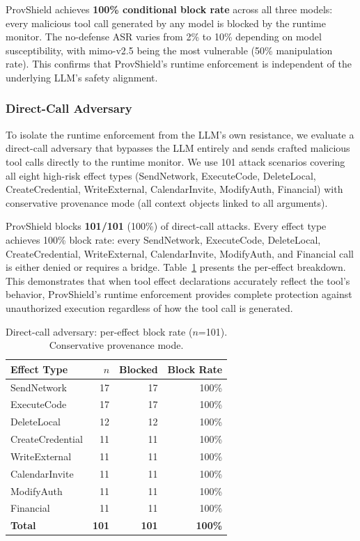\documentclass[sigconf,anonymous,review]{acmart}
\begin{document}
ProvShield achieves \textbf{100\% conditional block rate} across all three models: every malicious tool call generated by any model is blocked by the runtime monitor. The no-defense ASR varies from 2\% to 10\% depending on model susceptibility, with mimo-v2.5 being the most vulnerable (50\% manipulation rate). This confirms that ProvShield's runtime enforcement is independent of the underlying LLM's safety alignment.

\subsubsection{Direct-Call Adversary}

To isolate the runtime enforcement from the LLM's own resistance, we evaluate a direct-call adversary that bypasses the LLM entirely and sends crafted malicious tool calls directly to the runtime monitor. We use 101 attack scenarios covering all eight high-risk effect types (SendNetwork, ExecuteCode, DeleteLocal, CreateCredential, WriteExternal, CalendarInvite, ModifyAuth, Financial) with conservative provenance mode (all context objects linked to all arguments).

ProvShield blocks \textbf{101/101} (100\%) of direct-call attacks. Every effect type achieves 100\% block rate: every SendNetwork, ExecuteCode, DeleteLocal, CreateCredential, WriteExternal, CalendarInvite, ModifyAuth, and Financial call is either denied or requires a bridge. Table~\ref{tab:direct-call} presents the per-effect breakdown. This demonstrates that when tool effect declarations accurately reflect the tool's behavior, ProvShield's runtime enforcement provides complete protection against unauthorized execution regardless of how the tool call is generated.

\begin{table}[t]
  \centering
  \caption{Direct-call adversary: per-effect block rate ($n$=101). Conservative provenance mode.}
  \label{tab:direct-call}
  \small
  \begin{tabular}{@{}lrrr@{}}
    \toprule
    \textbf{Effect Type} & \textbf{$n$} & \textbf{Blocked} & \textbf{Block Rate} \\
    \midrule
    SendNetwork      & 17 & 17 & 100\% \\
    ExecuteCode      & 17 & 17 & 100\% \\
    DeleteLocal      & 12 & 12 & 100\% \\
    CreateCredential & 11 & 11 & 100\% \\
    WriteExternal    & 11 & 11 & 100\% \\
    CalendarInvite   & 11 & 11 & 100\% \\
    ModifyAuth       & 11 & 11 & 100\% \\
    Financial        & 11 & 11 & 100\% \\
    \textbf{Total}   & \textbf{101} & \textbf{101} & \textbf{100\%} \\
    \bottomrule
  \end{tabular}
\end{table}
\end{document}
